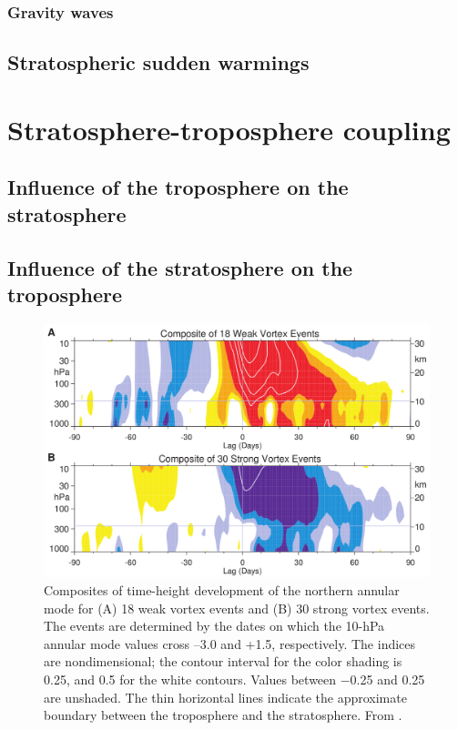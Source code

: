 \subsubsection{Gravity waves}


\subsection{Stratospheric sudden warmings}


\section{Stratosphere-troposphere coupling}

\subsection{Influence of the troposphere on the stratosphere}
\subsection{Influence of the stratosphere on the troposphere}

\begin{figure}
 \centering
 \noindent\includegraphics[width=\textwidth]{figures/chapter-intro/Baldwin_Dunkerton.png}
 \caption[NAM composite from \citet{Baldwin2001a}]{Composites of time-height
   development of the northern annular mode for (A) 18 weak vortex events and
   (B) 30 strong vortex events. The events are determined by the dates on which
   the 10-hPa annular mode values cross –3.0 and +1.5, respectively. The indices
   are nondimensional; the contour interval for the color shading is 0.25, and
   0.5 for the white contours. Values between −0.25 and 0.25 are unshaded. The
   thin horizontal lines indicate the approximate boundary between the
   troposphere and the stratosphere. From \citet{Baldwin2001a}.}
 \label{fig:baldwin_dunkerton}
\end{figure}


